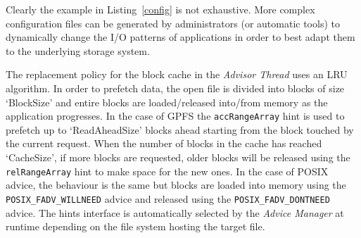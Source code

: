 Clearly the example in Listing~\ref{config} is not exhaustive. More complex configuration files can be generated by administrators (or automatic tools) to dynamically change the I/O patterns of applications in order to best adapt them to the underlying storage system. %

The replacement policy for the block cache in the \textit{Advisor Thread} uses an LRU algorithm. In order to prefetch data, the open file is divided into blocks of size `BlockSize' and entire blocks are loaded/released into/from memory as the application progresses. In the case of GPFS the \texttt{accRangeArray} hint is used to prefetch up to `ReadAheadSize' blocks ahead starting from the block touched by the current request. When the number of blocks in the cache has reached `CacheSize', if more blocks are requested, older blocks will be released using the \texttt{relRangeArray} hint to make space for the new ones. In the case of POSIX advice, the behaviour is the same but blocks are loaded into memory using the \texttt{POSIX\_FADV\_WILLNEED} advice and released using the \texttt{POSIX\_FADV\_DONTNEED} advice. The hints interface is automatically selected by the \textit{Advice Manager} at runtime depending on the file system hosting the target file. 

